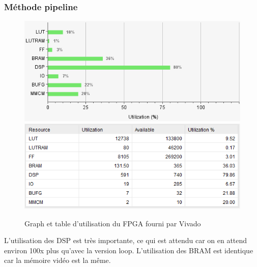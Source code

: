 \documentclass[LPSC_Labo03_SDeriaz]{subfiles}
\begin{document}
\subsubsection{Méthode pipeline}
\begin{figure}[H]
\centering
\includegraphics[scale=0.5]{utilisation_graph_pipeline.png}
\includegraphics[scale=0.5]{utilisation_table_pipeline.png}
\caption{Graph et table d'utilisation du FPGA fourni par Vivado}
\end{figure}
L'utilisation des DSP est très importante, ce qui est attendu car on en attend environ 100x plus qu'avec la version loop. L'utilisation des BRAM est identique car la mémoire vidéo est la même.
\end{document}

